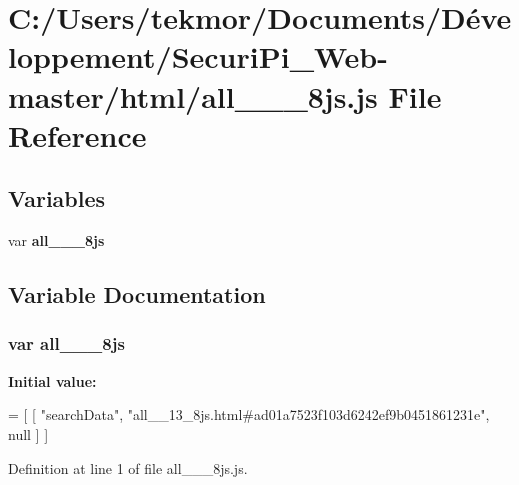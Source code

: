 \section{C\+:/\+Users/tekmor/\+Documents/\+Développement/\+Securi\+Pi\+\_\+\+Web-\/master/html/all\+\_\+\+\_\+\_\+8js.js File Reference}
\label{all____13__8js_8js}
\subsection*{Variables}
\begin{DoxyCompactItemize}
\item 
var {\bf all\+\_\+\+\_\+\_\+8js}
\end{DoxyCompactItemize}


\subsection{Variable Documentation}
\subsubsection[{all\+\_\+\+\_\+13\+\_\+8js}]{\setlength{\rightskip}{0pt plus 5cm}var all\+\_\+\+\_\+\_\+8js}\label{all____13__8js_8js_ad497beb903b8a9ea6bf305ce89aa3026}
{\bfseries Initial value\+:}
\begin{DoxyCode}
=
[
    [ \textcolor{stringliteral}{"searchData"}, \textcolor{stringliteral}{"all\_\_13\_8js.html#ad01a7523f103d6242ef9b0451861231e"}, null ]
]
\end{DoxyCode}


Definition at line 1 of file all\+\_\+\+\_\+\_\+8js.\+js.

